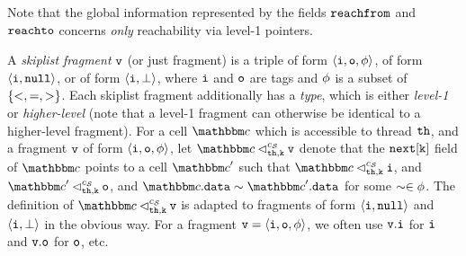 Note that the global information represented by the fields $\mathtt{reachfrom}$ and
$\mathtt{reachto}$ concerns {\em only} reachability via level-1 pointers.

A {\em skiplist fragment} $\mathtt{v}$ (or just fragment)
is a triple of form
$\left\langle\mathtt{i},\mathtt{o},\phi\right\rangle$, of form
$\left\langle\mathtt{i},{\tt null}\right\rangle$, or of form
$\left\langle\mathtt{i},\bot\right\rangle$,
where $\mathtt{i}$ and $\mathtt{o}$ are tags
    and $\phi$ is a subset of $\left\{<, =, >\right\}$.
    Each skiplist fragment additionally has a {\em type}, which is
    either {\em level-1} or {\em higher-level} (note that a level-1 fragment
    can otherwise be identical to a higher-level fragment).
For a cell $\cell$ which is accessible to thread ${\tt th}$, and a fragment
$\mathtt{v}$ of form $\left\langle\mathtt{i},\mathtt{o},\phi\right\rangle$, let $\cell \lsatfrag{\klevel}{\thread}{\sconf}\frag$ denote that
the ${\tt next[k]}$ field of $\cell$ points to a cell $\cell'$ such that
  $\cell \lsatfrag{\klevel}{\thread}{\sconf} \inat{\frag}$,
and
$\cell' \lsatfrag{\klevel}{\thread}{\sconf} \outat{\frag}$, and 
  $\cell.\mathtt{data} \sim \cell'.\mathtt{data}$ for some $\sim \in \phi$.
The definition of $\cell \lsatfrag{\klevel}{\thread}{\sconf}\frag$
is adapted to fragments of form
$\left\langle\mathtt{i},{\tt null}\right\rangle$ and $\left\langle\mathtt{i},\bot\right\rangle$ in the
obvious way. For a fragment $\mathtt{v} = \left\langle\mathtt{i},\mathtt{o},\phi\right\rangle$, we often use
$\mathtt{v}.\mathtt{i}$ for $\mathtt{i}$ and
$\mathtt{v}.\mathtt{o}$ for $\mathtt{o}$, etc.


